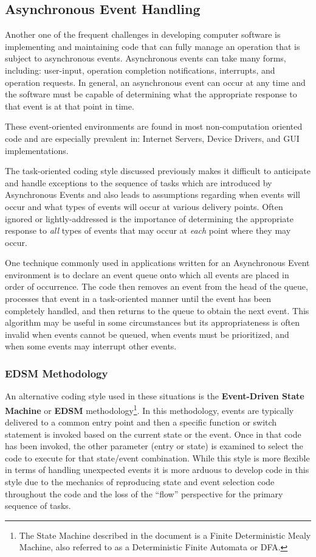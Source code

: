 \subsection{Asynchronous Event Handling}

Another one of the frequent challenges in developing computer software
is implementing and maintaining code that can fully manage an
operation that is subject to asynchronous events.  Asynchronous events
can take many forms, including: user-input, operation completion
notifications, interrupts, and operation requests.  In general, an
asynchronous event can occur at any time and the software must be
capable of determining what the appropriate response to that event is
at that point in time.

These event-oriented environments are found in most non-computation
oriented code and are especially prevalent in: Internet Servers,
Device Drivers, and GUI implementations.

The task-oriented coding style discussed previously makes it difficult
to anticipate and handle exceptions to the sequence of tasks which are
introduced by Asynchronous Events and also leads to assumptions
regarding when events will occur and what types of events will occur
at various delivery points.  Often ignored or lightly-addressed is the
importance of determining the appropriate response to {\em all} types
of events that may occur at {\em each} point where they may occur.

One technique commonly used in applications written for an
Asynchronous Event environment is to declare an event queue onto which
all events are placed in order of occurrence.  The code then removes
an event from the head of the queue, processes that event in a
task-oriented manner until the event has been completely handled, and
then returns to the queue to obtain the next event.  This algorithm
may be useful in some circumstances but its appropriateness is often
invalid when events cannot be queued, when events must be prioritized,
and when some events may interrupt other events.

\subsubsection{EDSM Methodology}

An alternative coding style used in these situations is the {\bf
  Event-Driven State Machine} or {\bf EDSM} methodology\footnote{The
  State Machine described in the document is a Finite Deterministic
  Mealy Machine, also referred to as a Deterministic Finite Automata
  or DFA.}.  In this methodology, events are typically delivered to a
common entry point and then a specific function or switch statement is
invoked based on the current state or the event.  Once in that code
has been invoked, the other parameter (entry or state) is examined to
select the code to execute for that state/event combination.  While
this style is more flexible in terms of handling unexpected events it
is more arduous to develop code in this style due to the mechanics of
reproducing state and event selection code throughout the code and the
loss of the ``flow'' perspective for the primary sequence of tasks.


